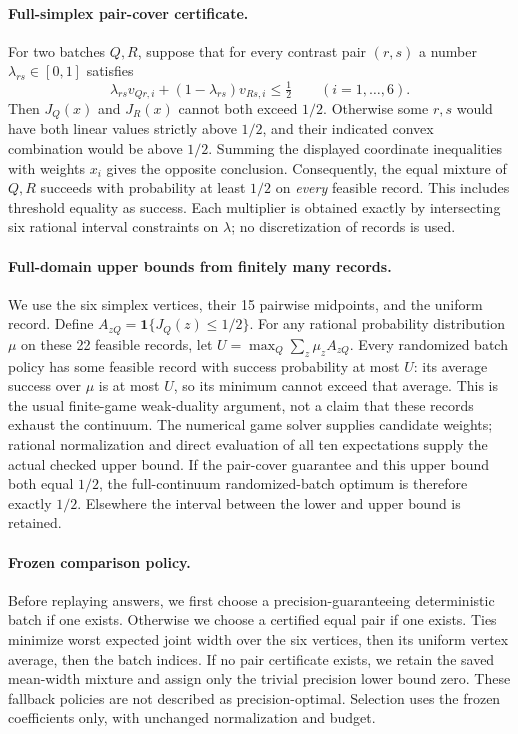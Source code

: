 \paragraph{Full-simplex pair-cover certificate.}
For two batches $Q,R$, suppose that for every contrast pair $(r,s)$ a
number $\lambda_{rs}\in[0,1]$ satisfies
\[
 \lambda_{rs}v_{Qr,i}+(1-\lambda_{rs})v_{Rs,i}
 \leq\tfrac12\qquad(i=1,\ldots,6).
\]
Then $J_Q(x)$ and $J_R(x)$ cannot both exceed $1/2$.  Otherwise some $r,s$
would have both linear values strictly above $1/2$, and their indicated
convex combination would be above $1/2$.  Summing the displayed coordinate
inequalities with weights $x_i$ gives the opposite conclusion.  Consequently,
the equal mixture of $Q,R$ succeeds with probability at least $1/2$ on
\emph{every} feasible record.  This includes threshold equality as success.
Each multiplier is obtained exactly by intersecting six rational interval
constraints on $\lambda$; no discretization of records is used.

\paragraph{Full-domain upper bounds from finitely many records.}
We use the six simplex vertices, their 15 pairwise midpoints, and the
uniform record.  Define $A_{zQ}=\boldsymbol1\{J_Q(z)\leq1/2\}$.
For any rational probability distribution $\mu$ on these 22 feasible
records, let $U=\max_Q\sum_z\mu_z A_{zQ}$.  Every randomized batch policy
has some feasible record with success probability at most $U$: its
average success over $\mu$ is at most $U$, so its minimum cannot exceed
that average.  This is the usual finite-game weak-duality argument, not
a claim that these records exhaust the continuum.  The numerical game
solver supplies candidate weights; rational normalization and direct
evaluation of all ten expectations supply the actual checked upper bound.
If the pair-cover guarantee and this upper bound both equal $1/2$, the
full-continuum randomized-batch optimum is therefore exactly $1/2$.
Elsewhere the interval between the lower and upper bound is retained.

\paragraph{Frozen comparison policy.}
Before replaying answers, we first choose a precision-guaranteeing
deterministic batch if one exists.  Otherwise we choose a certified equal
pair if one exists.  Ties minimize worst expected joint width over the six
vertices, then its uniform vertex average, then the batch indices.  If no
pair certificate exists, we retain the saved mean-width mixture and assign
only the trivial precision lower bound zero.  These fallback policies are
not described as precision-optimal.  Selection uses the frozen coefficients
only, with unchanged normalization and budget.

